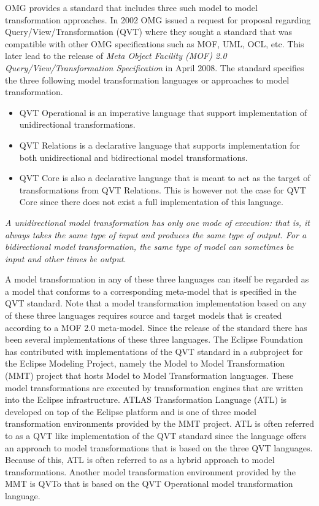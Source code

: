 OMG provides a standard that includes three such model to model transformation
approaches. In 2002 OMG issued a request for proposal regarding
Query/View/Transformation (QVT)\cite{QVT} where they sought a standard that was
compatible with other OMG specifications such as MOF, UML, OCL, etc. This later
lead to the release of \textit{Meta Object Facility (MOF) 2.0
Query/View/Transformation Specification} in April 2008. The standard specifies
the three following model transformation languages or approaches to model
transformation.
\begin{itemize}
  \item QVT Operational is an imperative language that support implementation of
  unidirectional transformations.
  \item QVT Relations is a declarative language that supports implementation for
  both unidirectional and bidirectional model transformations.
  \item QVT Core is also a declarative language that is meant to act as the
  target of transformations from QVT Relations. This is however not the case
  for QVT Core since there does not exist a full implementation of this
  language.
\end{itemize}
\textit{A unidirectional model transformation has only one mode of execution:
that is, it always takes the same type of input and produces the same type of
output. For a bidirectional model transformation, the same type of model can
sometimes be input and other times be output}\cite{WikiMT}. 

A model transformation in any of these three languages can itself be regarded as
a model that conforms to a corresponding meta-model that is specified in the QVT
standard. Note that a model transformation implementation based on any of
these three languages requires source and target models that is created
according to a MOF 2.0 meta-model. Since the release of the standard there has
been several implementations of these three languages. The Eclipse Foundation
has contributed with implementations of the QVT standard in a subproject for
the Eclipse Modeling Project\cite{EMP}, namely the Model to Model
Transformation (MMT) project that hosts Model to Model Transformation
languages. These model transformations are executed by transformation engines
that are written into the Eclipse infrastructure. ATLAS Transformation Language
(ATL)\cite{Jouault2008} is developed on top of the Eclipse platform and is one
of three model transformation environments provided by the MMT
project\cite{MMT}. ATL is often referred to as a QVT like implementation of the
QVT standard since the language offers an approach to model transformations
that is based on the three QVT languages. Because of this, ATL is often
referred to as a hybrid approach to model transformations. Another model
transformation environment provided by the MMT is QVTo\cite{dvorak2008model}
that is based on the QVT Operational model transformation language.

